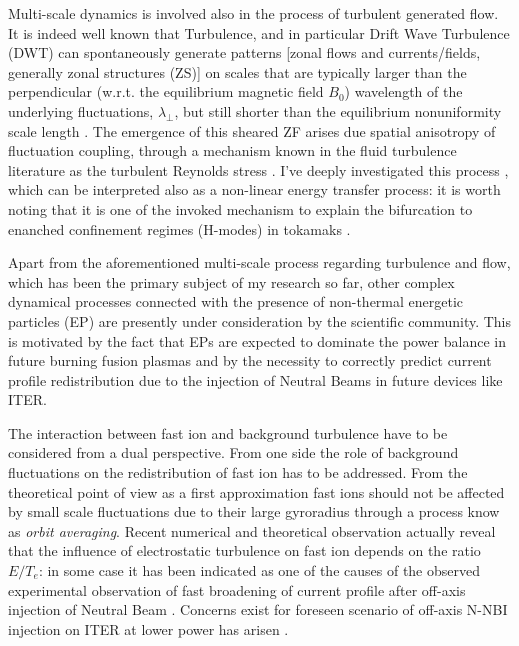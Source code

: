 \documentclass[12pt,a4paper]{article}
\begin{document}
Multi-scale dynamics is involved also in the process of
turbulent generated flow. It is indeed well known that Turbulence, and
in particular Drift Wave Turbulence (DWT) can spontaneously generate patterns [zonal flows and
currents/fields, generally zonal structures (ZS)] 
on scales that are typically larger than the perpendicular (w.r.t. the
equilibrium magnetic field $B_0$) 
wavelength of the underlying fluctuations, $\lambda_{\perp}$, but
still shorter than the equilibrium nonuniformity scale length
\cite{Hasegawa:1979cp}. 
The emergence of this sheared ZF arises due spatial anisotropy of
fluctuation coupling, through a mechanism known in the fluid
turbulence literature as the turbulent Reynolds stress
\cite{Tynan:2009p4426}. I've deeply investigated this process \cite{Vianello:2005p1976,Vianello:2006p1149},
which can be interpreted also as a
non-linear energy transfer process: it is worth noting that it is one
of the invoked mechanism 
to explain the bifurcation to enanched confinement regimes
(H-modes) in tokamaks \cite{Schmitz:2012hwa}. 

Apart from the aforementioned multi-scale process regarding turbulence
and flow, which has been the primary subject of my research so far,
other complex dynamical processes connected with the presence of non-thermal
energetic particles (EP) are presently under consideration by the
scientific community. This is motivated
by the fact that EPs are expected to dominate the power balance in
future burning fusion plasmas \cite{Zonca:2015hs} and by the necessity
to correctly predict current profile redistribution due to the
injection of Neutral Beams in future devices like ITER. 

The interaction between fast ion and background turbulence have to be
considered from a dual perspective. 
From one side the role of background fluctuations on the
redistribution of fast ion has to be addressed. From the theoretical
point of view as a first approximation fast ions should not be
affected by small scale fluctuations due to their large gyroradius
through a process know as \emph{orbit averaging}. Recent numerical and
theoretical observation \cite{Albergante:2011bj} actually reveal
that the influence of electrostatic turbulence on fast ion depends on the ratio
$E/T_e$: in some case it has been indicated as one of the causes of
the observed experimental observation of fast broadening of current profile after
off-axis injection of Neutral Beam
\cite{Heidbrink:2009wv,Baranov:2009p4033}. Concerns exist for
foreseen scenario of off-axis N-NBI injection on ITER at lower power
has arisen \cite{Albergante:2011bj}. 
\end{document}
